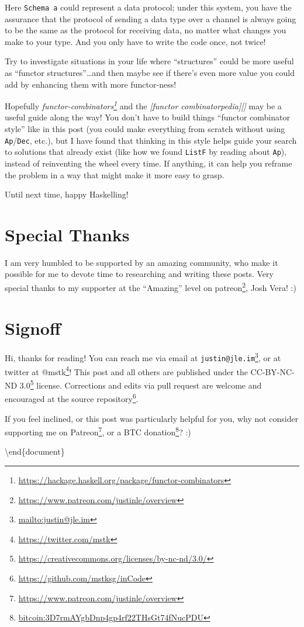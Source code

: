 \documentclass[]{article}
\renewcommand{\href}[2]{#2\footnote{\url{#1}}}
\begin{document}
Here \texttt{Schema\ a} could represent a data protocol; under this system, you
have the assurance that the protocol of sending a data type over a channel is
always going to be the same as the protocol for receiving data, no matter what
changes you make to your type. And you only have to write the code once, not
twice!

Try to investigate situations in your life where ``structures'' could be more
useful as ``functor structures''\ldots and then maybe see if there's even more
value you could add by enhancing them with more functor-ness!

Hopefully
\emph{\href{https://hackage.haskell.org/package/functor-combinators}{functor-combinators}}
and the \emph{{[}functor combinatorpedia{]}{[}{]}} may be a useful guide along
the way! You don't have to build things ``functor combinator style'' like in
this post (you could make everything from scratch without using
\texttt{Ap}/\texttt{Dec}, etc.), but I have found that thinking in this style
helps guide your search to solutions that already exist (like how we found
\texttt{ListF} by reading about \texttt{Ap}), instead of reinventing the wheel
every time. If anything, it can help you reframe the problem in a way that might
make it more easy to grasp.

Until next time, happy Haskelling!

\section{Special Thanks}\label{special-thanks}

I am very humbled to be supported by an amazing community, who make it possible
for me to devote time to researching and writing these posts. Very special
thanks to my supporter at the ``Amazing'' level on
\href{https://www.patreon.com/justinle/overview}{patreon}, Josh Vera! :)

\section{Signoff}\label{signoff}

Hi, thanks for reading! You can reach me via email at
\href{mailto:justin@jle.im}{\nolinkurl{justin@jle.im}}, or at twitter at
\href{https://twitter.com/mstk}{@mstk}! This post and all others are published
under the \href{https://creativecommons.org/licenses/by-nc-nd/3.0/}{CC-BY-NC-ND
3.0} license. Corrections and edits via pull request are welcome and encouraged
at \href{https://github.com/mstksg/inCode}{the source repository}.

If you feel inclined, or this post was particularly helpful for you, why not
consider \href{https://www.patreon.com/justinle/overview}{supporting me on
Patreon}, or a \href{bitcoin:3D7rmAYgbDnp4gp4rf22THsGt74fNucPDU}{BTC donation}?
:)

\textbackslash end\{document\}
\end{document}

